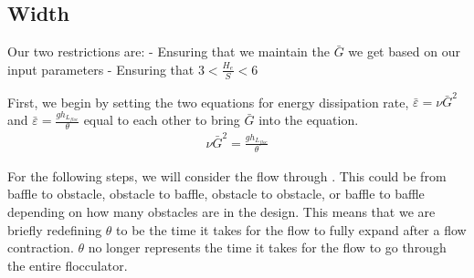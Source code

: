 \documentclass[letterpaper,10pt,english]{sphinxmanual}
\begin{document}
\subsection{Width}
\label{\detokenize{Flocculation/Floc_Derivations:width}}
Our two restrictions are: - Ensuring that we maintain the \(\bar G\)
we get based on our input parameters - Ensuring that
\(3 < \frac{H_e}{S} < 6\)

First, we begin by setting the two equations for energy dissipation
rate, \(\bar \varepsilon = \nu \bar G^2\) and
\(\bar \varepsilon = \frac{g h_{L_{floc}}}{\theta}\) equal to each
other to bring \(\bar G\) into the equation.
\begin{equation}\label{equation:Flocculation/Floc_Derivations:Flocculation/Floc_Derivations:0}
\begin{split}\nu \bar G^2 = \frac{g h_{L_{floc}}}{\theta}\end{split}
\end{equation}

For the following steps, we will consider the flow through . This
could be from baffle to obstacle, obstacle to baffle, obstacle to
obstacle, or baffle to baffle depending on how many obstacles are in the
design. This means that we are briefly redefining \(\theta\) to be
the time it takes for the flow to fully expand after a flow contraction.
\(\theta\) no longer represents the time it takes for the flow to go
through the entire flocculator.
\end{document}
